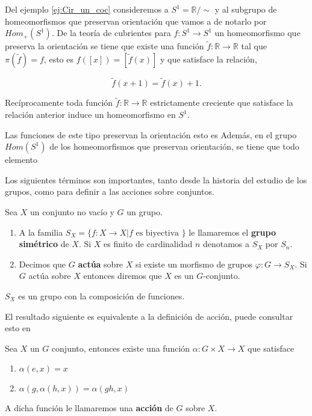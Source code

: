 \begin{ej}
Del ejemplo \ref{ej:Cir_un_coc} consideremos a $S^1=\mathbb{R}/\sim$ y al subgrupo de homeomorfismos que preservan orientación que vamos a de notarlo por $Hom_+(S^1)$. De la teoría de cubrientes para $f: S^1 \to S^1$ un homeomorfismo que preserva la orientación se tiene que existe una función $\tilde{f}:\mathbb{R} \to \mathbb{R}$ tal que $\pi(\tilde{f})=f$, esto es $f([x])=[\tilde{f}(x)]$ y que satisface la relación,

$$\tilde{f}(x+1)=\tilde{f}(x)+1.$$

Recíprocamente toda función  $\tilde{f}:\mathbb{R} \to \mathbb{R}$ estrictamente  creciente que satisface la relación anterior induce un homeomorfismo en $S^1.$


 Las funciones de este tipo preservan la orientación esto es  Además, en el grupo $Hom(S^1)$ de los homeomorfismos que preservan orientación, se tiene que todo elemento 
\end{ej}
	
	Los siguientes términos son importantes, tanto desde la historia del estudio de los grupos, como para definir a las acciones sobre conjuntos.	
	
	\begin{df}
	Sea $X$ un conjunto no vacío y $G$ un grupo.
	\begin{enumerate}
	\item A la familia $S_X=\{f:X \to X| f \text{ es biyectiva } \}$ le llamaremos el \textbf{grupo simétrico} de $X$. Si $X$ es finito de cardinalidad $n$ denotamos a $S_X$ por $S_n$.
	\item Decimos que $G$ \textbf{actúa} sobre $X$ si existe un morfismo de grupos $\varphi:G \to S_X$.  Si $G$ actúa sobre $X$ entonces diremos que $X$ es un $G$-conjunto.
	\end{enumerate}
	
	\end{df}
	
	\begin{nt}
	$S_X$ es un grupo con la composición de funciones. 
	\end{nt}	
	El resultado siguiente es equivalente a la definición de acción, puede consultar esto en 
	\begin{te}
	Sea $X$ un $G$ conjunto, entonces existe una función $\alpha:G \times X \to X$ que satisface
	\begin{enumerate}
	\item $\alpha(e,x)=x$
	\item $\alpha(g,\alpha(h,x))=\alpha(gh,x)$
	\end{enumerate}
	A dicha función le llamaremos una \textbf{acción} de $G$ sobre $X$.
	\end{te}
	
